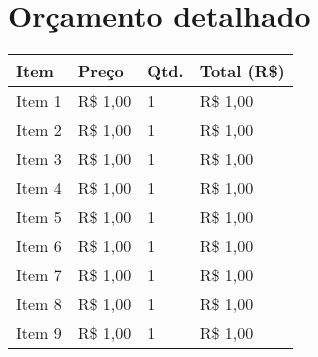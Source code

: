 \newpage
\section{Orçamento detalhado}
\label{sc:orcamento}

\begin{longtable}{@{}l l l l}

\toprule%
 \centering%
   \textbf{Item}
 & \textbf{Preço}
 & \textbf{Qtd.}
 & \textbf{Total (R\$)} \\


\cmidrule[0.4pt](r{0.125em}){1-1}%
\cmidrule[0.4pt](lr{0.125em}){2-2}%
\cmidrule[0.4pt](lr{0.125em}){3-3}%
\cmidrule[0.4pt](lr{0.125em}){4-4}%
\endhead


Item 1 & R\$ 1,00 & 1 & R\$ 1,00 \\
\myrowcolour%
Item 2 & R\$ 1,00 & 1 & R\$ 1,00 \\
Item 3 & R\$ 1,00 & 1 & R\$ 1,00 \\
\myrowcolour%
Item 4 & R\$ 1,00 & 1 & R\$ 1,00 \\
Item 5 & R\$ 1,00 & 1 & R\$ 1,00 \\
\myrowcolour%
Item 6 & R\$ 1,00 & 1 & R\$ 1,00 \\
Item 7 & R\$ 1,00 & 1 & R\$ 1,00 \\
\myrowcolour%
Item 8 & R\$ 1,00 & 1 & R\$ 1,00 \\
Item 9 & R\$ 1,00 & 1 & R\$ 1,00 \\

\bottomrule

\end{longtable}
